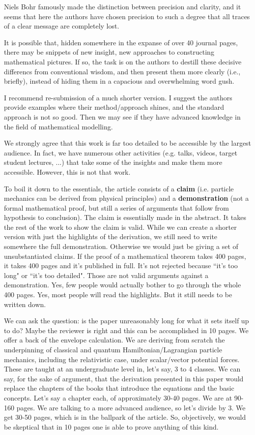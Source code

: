 \documentclass[10pt]{article}
\begin{document}
\begin{response}{
		
		Niels Bohr famously made the distinction between precision and clarity, and it seems that here the authors have chosen precision to such a degree that all traces of a clear message are completely lost. 
		
		It is possible that, hidden somewhere in the expanse of over 40 journal pages, there may be snippets of new insight, new approaches to constructing mathematical pictures. If so, the task is on the authors to destill these decisive differencs from conventional wisdom, and then present them more clearly (i.e., briefly), instead of hiding them in a capacious and overwhelming word gush. 
		
		I recommend re-submission of a much shorter version. I suggest the authors provide examples where their method/approach shines, and the standard approach is not so good. Then we may see if they have advanced knowledge in the field of mathematical modelling. 
	}
We strongly agree that this work is far too detailed to be accessible by the largest audience. In fact, we have numerous other activities (e.g. talks, videos, target student lectures, ...) that take some of the insights and make them more accessible. However, this is not that work.

To boil it down to the essentials, the article consists of a \textbf{claim} (i.e. particle mechanics can be derived from physical principles) and a \textbf{demonstration} (not a formal mathematical proof, but still a series of arguments that follow from hypothesis to conclusion). The claim is essentially made in the abstract. It takes the rest of the work to show the claim is valid. While we can create a shorter version with just the highlights of the derivation, we still need to write somewhere the full demonstration. Otherwise we would just be giving a set of unsubstantiated claims. If the proof of a mathematical theorem takes 400 pages, it takes 400 pages and it's published in full. It's not rejected because ``it's too long" or ``it's too detailed". Those are not valid arguments against a demonstration. Yes, few people would actually bother to go through the whole 400 pages. Yes, most people will read the highlights. But it still needs to be written down.

We can ask the question: is the paper unreasonably long for what it sets itself up to do? Maybe the reviewer is right and this can be accomplished in 10 pages. We offer a back of the envelope calculation. We are deriving from scratch the underpinning of classical and quantum Hamiltonian/Lagrangian particle mechanics, including the relativistic case, under scalar/vector potential forces. These are taught at an undergraduate level in, let's say, 3 to 4 classes. We can say, for the sake of argument, that the derivation presented in this paper would replace the chapters of the books that introduce the equations and the basic concepts. Let's say a chapter each, of approximately 30-40 pages. We are at 90-160 pages. We are talking to a more advanced audience, so let's divide by 3. We get 30-50 pages, which is in the ballpark of the article. So, objectively, we would be skeptical that in 10 pages one is able to prove anything of this kind.


\end{response}
\end{document}
